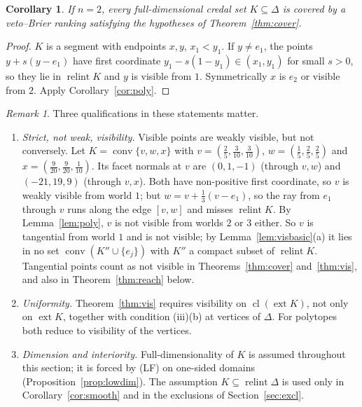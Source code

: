 \documentclass[11pt]{article}
\DeclareMathOperator{\conv}{conv}
\DeclareMathOperator{\relint}{relint}
\DeclareMathOperator{\ext}{ext}
\DeclareMathOperator{\cl}{cl}
\theoremstyle{plain}
\newtheorem{corollary}[theorem]{Corollary}
\theoremstyle{definition}
\theoremstyle{remark}
\newtheorem{remark}[theorem]{Remark}
\begin{document}
\begin{corollary}\label{cor:n2}
If $n=2$, every full-dimensional credal set $K\subseteq\Delta$ is covered by a
veto--Brier ranking satisfying the hypotheses of Theorem~\ref{thm:cover}.
\end{corollary}

\begin{proof}
$K$ is a segment with endpoints $x,y$, $x_1<y_1$. If $y\neq e_1$, the points
$y+s(y-e_1)$ have first coordinate $y_1-s(1-y_1)\in(x_1,y_1)$ for small $s>0$, so they lie in
$\relint K$ and $y$ is visible from $1$. Symmetrically $x$ is $e_2$ or visible from $2$.
Apply Corollary~\ref{cor:poly}.
\end{proof}

\begin{remark}\label{rem:qual}
Three qualifications in these statements matter.
\begin{enumerate}[label=(\arabic*)]
  \item \emph{Strict, not weak, visibility.} Visible points are weakly visible, but not
  conversely. Let $K=\conv\{v,w,x\}$ with $v=(\frac25,\frac3{10},\frac3{10})$,
  $w=(\frac15,\frac25,\frac25)$ and $x=(\frac9{20},\frac9{20},\frac1{10})$. Its facet
  normals at $v$ are $(0,1,-1)$ (through $v,w$) and $(-21,19,9)$ (through $v,x$). Both have
  non-positive first coordinate, so $v$ is weakly visible from world $1$; but
  $w=v+\frac13(v-e_1)$, so the ray from $e_1$ through $v$ runs along the edge $[v,w]$ and
  misses $\relint K$. By Lemma~\ref{lem:poly}, $v$ is not visible from worlds $2$ or $3$
  either. So $v$ is tangential from world $1$ and is not visible; by
  Lemma~\ref{lem:visbasic}(a) it lies in no set $\conv(K''\cup\{e_j\})$ with $K''$ a
  compact subset of $\relint K$. Tangential points count as not visible in
  Theorems~\ref{thm:cover} and~\ref{thm:vis}, and also in Theorem~\ref{thm:reach} below.
  \item \emph{Uniformity.} Theorem~\ref{thm:vis} requires visibility on $\cl(\ext K)$, not
  only on $\ext K$, together with condition (iii)(b) at vertices of $\Delta$. For
  polytopes both reduce to visibility of the vertices.
  \item \emph{Dimension and interiority.} Full-dimensionality of $K$ is assumed throughout
  this section; it is forced by (LF) on one-sided domains
  (Proposition~\ref{prop:lowdim}). The assumption $K\subseteq\relint\Delta$ is used only in
  Corollary~\ref{cor:smooth} and in the exclusions of Section~\ref{sec:excl}.
\end{enumerate}
\end{remark}
\end{document}
